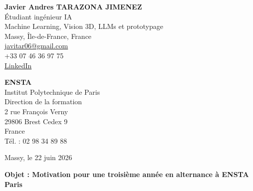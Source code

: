 \documentclass[10pt,a4paper]{article}
\begin{document}
\begin{minipage}[t]{0.48\textwidth}
\textbf{\large Javier Andres TARAZONA JIMENEZ}\\
Étudiant ingénieur IA \\
Machine Learning, Vision 3D, LLMs et prototypage \\
Massy, Île-de-France, France\\
\href{mailto:javitar06@gmail.com}{javitar06@gmail.com}\\
+33 07 46 36 97 75\\
\href{https://www.linkedin.com/in/javier-andres-tarazona-jimenez-84b489222/}{LinkedIn}
\end{minipage}
\hfill
\begin{minipage}[t]{0.46\textwidth}
\raggedleft
\textbf{ENSTA}\\
Institut Polytechnique de Paris\\
Direction de la formation\\
\vspace{0.35em}
2 rue François Verny\\
29806 Brest Cedex 9\\
France\\
\vspace{0.35em}
Tél. : 02 98 34 89 88
\end{minipage}

\vspace{1.1cm}

\raggedleft
Massy, le 22 juin 2026

\vspace{0.7cm}

\raggedright
\textbf{Objet : Motivation pour une troisième année en alternance à ENSTA Paris}

\vspace{0.5cm}
\end{document}
